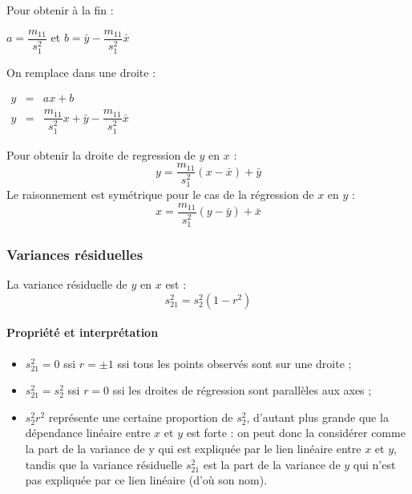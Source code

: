 Pour obtenir à la fin :
\begin{center}
	$\boxed{a = \dfrac{m_{11}}{s_1^2}}$ et $\boxed{b = \bar{y} - \dfrac{m_{11}}{s_1^2} \bar{x}} $
\end{center}
On remplace dans une droite :
\begin{center}
	$\begin{array}{RRL}
		y&=&ax+b\\
		y&=&\dfrac{m_{11}}{s_1^2}x+\bar{y} - \dfrac{m_{11}}{s_1^2} \bar{x}
	\end{array}$
\end{center}
Pour obtenir la droite de regression de $y$ en $x$ :
$$\boxed{y = \dfrac{m_{11}}{s_1^2} (x - \bar{x}) + \bar{y}}$$
Le raisonnement est symétrique pour le cas de la régression de $x$ en $y$ :
$$\boxed{x = \dfrac{m_{11}}{s_1^2} (y - \bar{y}) + \bar{x}}$$





\newpage
\subsubsection{Variances résiduelles}
La variance résiduelle de $y$ en $x$ est :
$$\boxed{s_{21}^2 = s_2^2 (1-r^2)}$$
\paragraph{Propriété et interprétation}
\begin{itemize}
	\item $s_{21}^2 = 0$ ssi $r = \pm1$ ssi tous les points observés sont sur une droite ;
	\item $s_{21}^2 = s_2^2$ ssi $r = 0$ ssi les droites de régression sont parallèles aux axes ;
	\item $s_2^2r^2$ représente une certaine proportion de $s_2^2$, d’autant plus grande que la dépendance linéaire entre $x$ et $y$ est forte : on peut donc la considérer comme la part de la variance de y qui est expliquée par le lien linéaire entre $x$ et $y$, tandis que la variance résiduelle $s_{21}^2$ est la part de la variance de $y$ qui n’est pas expliquée par ce lien linéaire (d’où son nom).
\end{itemize}
